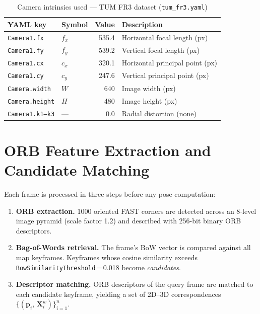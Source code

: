 \documentclass[12pt,a4paper]{article}
\begin{document}
\begin{table}[H]
\centering
\caption{Camera intrinsics used --- TUM FR3 dataset (\texttt{tum\_fr3.yaml})}
\begin{tabular}{llrl}
\toprule
YAML key & Symbol & Value & Description \\
\midrule
\texttt{Camera1.fx} & $f_x$ & 535.4 & Horizontal focal length (px) \\
\texttt{Camera1.fy} & $f_y$ & 539.2 & Vertical focal length (px) \\
\texttt{Camera1.cx} & $c_x$ & 320.1 & Horizontal principal point (px) \\
\texttt{Camera1.cy} & $c_y$ & 247.6 & Vertical principal point (px) \\
\texttt{Camera.width}  & $W$ & 640 & Image width (px) \\
\texttt{Camera.height} & $H$ & 480 & Image height (px) \\
\texttt{Camera1.k1--k3} & --- & 0.0 & Radial distortion (none) \\
\bottomrule
\end{tabular}
\end{table}

\section{ORB Feature Extraction and Candidate Matching}

Each frame is processed in three steps before any pose computation:

\begin{enumerate}
  \item \textbf{ORB extraction.} 1000 oriented FAST corners are detected across an
        8-level image pyramid (scale factor 1.2) and described with 256-bit binary
        ORB descriptors.

  \item \textbf{Bag-of-Words retrieval.} The frame's BoW vector is compared against
        all map keyframes. Keyframes whose cosine similarity exceeds
        \texttt{BowSimilarityThreshold}\,=\,0.018 become \emph{candidates}.

  \item \textbf{Descriptor matching.} ORB descriptors of the query frame are matched
        to each candidate keyframe, yielding a set of 2D--3D correspondences
        $\{(\mathbf{p}_i,\,\mathbf{X}^w_i)\}_{i=1}^{n}$.
\end{enumerate}
\end{document}
